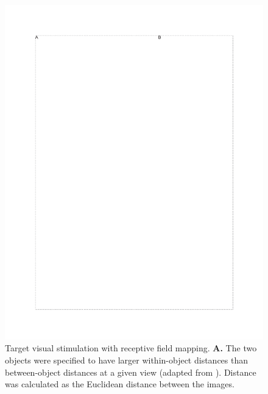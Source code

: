 \begin{figure}[t!]
\includegraphics[width=\textwidth]{figures/supplemental/fig_s5_vf_targeting/fig_s5_vf_targeting.pdf}
    \vspace{.1in}
    \caption[Visual Field Targeting]{Target visual stimulation with receptive field mapping.
    \textbf{A.} The two objects were specified to have larger within-object distances than between-object distances at a given view (adapted from \cite{Zoccolan2009}). Distance was calculated as the Euclidean distance between the images. 
    \label{supfig:vf_targeting}}
\end{figure}


